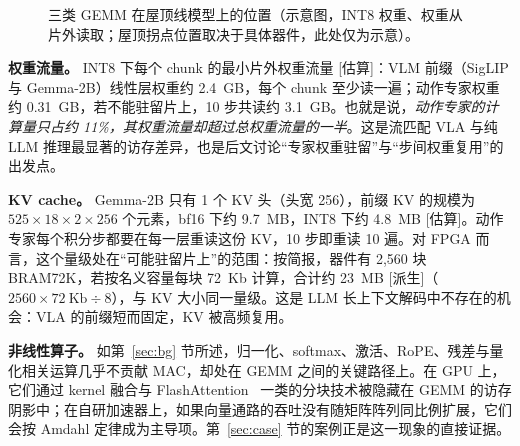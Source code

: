 \documentclass[a4paper,10.5pt]{ctexart}
\newcommand{\tD}{\textsf{[派生]}}           %
\newcommand{\tE}{\textsf{[估算]}}           %
\begin{document}
\begin{figure}[t]
\centering
{}
\caption{三类 GEMM 在屋顶线模型上的位置（示意图，INT8 权重、权重从片外读取；屋顶拐点位置取决于具体器件，此处仅为示意）。}
\label{fig:roofline}
\end{figure}

\textbf{权重流量。} INT8 下每个 chunk 的最小片外权重流量 \tE：VLM 前缀（SigLIP 与 Gemma-2B）线性层权重约 2.4~GB，每个 chunk 至少读一遍；动作专家权重约 0.31~GB，若不能驻留片上，10 步共读约 3.1~GB。也就是说，\emph{动作专家的计算量只占约 11\%，其权重流量却超过总权重流量的一半}。这是流匹配 VLA 与纯 LLM 推理最显著的访存差异，也是后文讨论“专家权重驻留”与“步间权重复用”的出发点。

\textbf{KV cache。} Gemma-2B 只有 1 个 KV 头（头宽 256），前缀 KV 的规模为 $525\times18\times2\times256$ 个元素，bf16 下约 9.7~MB，INT8 下约 4.8~MB \tE。动作专家每个积分步都要在每一层重读这份 KV，10 步即重读 10 遍。对 FPGA 而言，这个量级处在“可能驻留片上”的范围：按简报，器件有 2,560 块 BRAM72K，若按名义容量每块 72~Kb 计算，合计约 23~MB \tD（$2560\times72~\text{Kb}\div8$），与 KV 大小同一量级。这是 LLM 长上下文解码中不存在的机会：VLA 的前缀短而固定，KV 被高频复用。

\textbf{非线性算子。} 如第~\ref{sec:bg} 节所述，归一化、softmax、激活、RoPE、残差与量化相关运算几乎不贡献 MAC，却处在 GEMM 之间的关键路径上。在 GPU 上，它们通过 kernel 融合与 FlashAttention~\cite{flashattn} 一类的分块技术被隐藏在 GEMM 的访存阴影中；在自研加速器上，如果向量通路的吞吐没有随矩阵阵列同比例扩展，它们会按 Amdahl 定律成为主导项。第~\ref{sec:case} 节的案例正是这一现象的直接证据。
\end{document}
